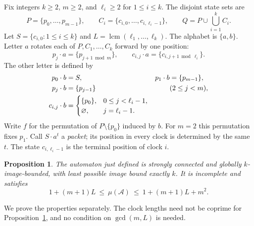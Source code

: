 \documentclass[acmsmall,screen,nonacm,11pt]{acmart}
\newtheorem{proposition}[theorem]{Proposition}
\newcommand{\emp}{\varnothing}
\newcommand{\calA}{\mathcal{A}}
\DeclareMathOperator{\lcm}{lcm}
\begin{document}
Fix integers $k\geq2$, $m\geq2$, and $\ell_i\geq2$ for $1\leq i\leq k$.
The disjoint state sets are
\[
 P=\{p_0,\ldots,p_{m-1}\},\qquad
 C_i=\{c_{i,0},\ldots,c_{i,\ell_i-1}\},\qquad
 Q=P\cup\bigcup_{i=1}^k C_i.
\]
Let $S=\{c_{i,0}:1\leq i\leq k\}$ and
$L=\lcm(\ell_1,\ldots,\ell_k)$. The alphabet is $\{a,b\}$.
Letter $a$ rotates each of $P,C_1,\ldots,C_k$ forward by one position:
\[
 p_j\cdot a=\{p_{j+1\bmod m}\},\qquad
 c_{i,j}\cdot a=\{c_{i,j+1\bmod\ell_i}\}.
\]
The other letter is defined by
\begin{align}
 p_0\cdot b&=S,& p_1\cdot b&=\{p_{m-1}\},\label{eq:bqueue}\\
 p_j\cdot b&=\{p_{j-1}\} &&(2\leq j<m),\notag\\
 c_{i,j}\cdot b&=
 \begin{cases}
  \{p_0\},&0\leq j<\ell_i-1,\\
  \emp,&j=\ell_i-1.
 \end{cases}\label{eq:bclock}
\end{align}
Write $f$ for the permutation of $P\setminus\{p_0\}$ induced by $b$.
For $m=2$ this permutation fixes $p_1$. Call $S\cdot a^t$ a
\emph{packet}; its position in every clock is determined by the same $t$.
The state $c_{i,\ell_i-1}$ is the terminal position of clock $i$.

\begin{proposition}\label{prop:threshold}
The automaton just defined is strongly connected and globally
$k$-image-bounded, with least possible image bound exactly $k$.
It is incomplete and satisfies
\begin{equation}\label{eq:threshold}
 1+(m+1)L\ \leq\ \mu(\calA)\ \leq\ 1+(m+1)L+m^2.
\end{equation}
\end{proposition}

We prove the properties separately. The clock lengths need not be coprime
for Proposition~\ref{prop:threshold}, and no condition on $\gcd(m,L)$ is needed.
\end{document}
